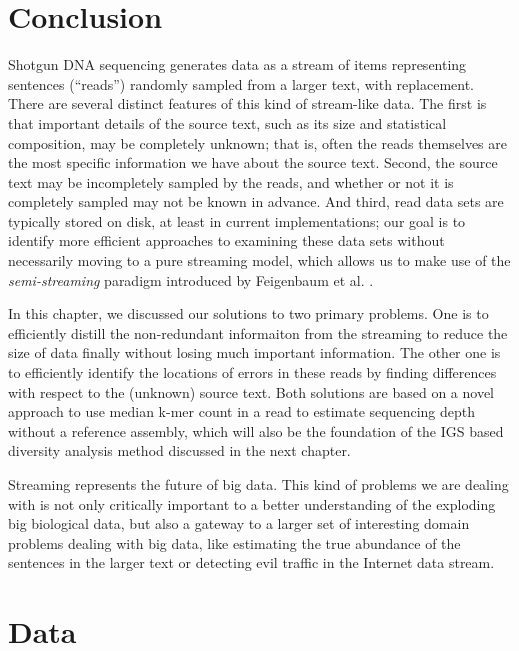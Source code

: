 \section{Conclusion}



Shotgun DNA sequencing generates data as a stream
of items representing sentences (``reads'') randomly sampled from a
larger text, with replacement. There are several distinct features of this kind
of stream-like data.
 The first is that important details of the source text,
such as its size and statistical composition, may be completely
unknown; that is, often the reads themselves are the most specific
information we have about the source text.  Second, the source text
may be incompletely sampled by the reads, and whether or not it is
completely sampled may not be known in advance.  And third, read
data sets are typically stored on disk, at least in current
implementations; our goal is to identify more efficient approaches to
examining these data sets without necessarily moving to a pure
streaming model, which allows us to make use of the {\em
  semi-streaming} paradigm introduced by Feigenbaum et
al. \cite{Feigenbaum2005}.

 In this chapter, we discussed our solutions to
two primary problems. One is to efficiently distill the non-redundant informaiton
from the streaming to reduce the size of data finally without losing much important 
information. The other one is to
efficiently identify the locations of errors in these reads by
finding differences with respect to the (unknown) source text. Both solutions 
are based on a novel approach to use median k-mer count in a read to estimate
sequencing depth without a reference assembly, which will also be the foundation
of the IGS based diversity analysis method discussed in the next chapter.

Streaming represents the future of big data. 
This kind of problems we are dealing with is not only critically important to 
a better understanding of the exploding big biological data, but also a 
gateway to a larger set of interesting domain problems
dealing with big data, like estimating the true abundance of the 
sentences in the larger text or detecting evil traffic in the Internet data
stream.






\section{Data}

